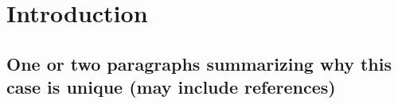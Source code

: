 \section{Introduction}

\subsection{One or two paragraphs summarizing why this case is unique (may include references)}


